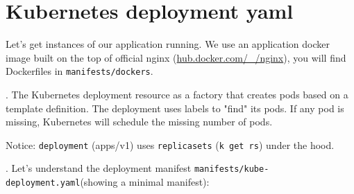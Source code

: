 \documentclass[12pt, letterpaper]{article}
\begin{document}

%
%
\section{Kubernetes deployment yaml}

Let's get instances of our application running. We use an application docker image built on the top of official nginx (\href{https://hub.docker.com/\_/nginx}{hub.docker.com/\_/nginx}), you will find Dockerfiles in \texttt{manifests/dockers}.

. The Kubernetes deployment resource as a factory that creates pods based on a template definition. The deployment uses labels to "find" its pods. If any pod is missing, Kubernetes will schedule the missing number of pods.

\begin{figure}[ht]
\centering
{}
\end{figure}

Notice: \verb|deployment| (apps/v1) uses \verb|replicasets| (\verb|k get rs|) under the hood.

. Let's understand the deployment manifest \texttt{manifests/kube-deployment.yaml}(showing a minimal manifest):

\inputminted{yaml}{manifests/kube-deployment.yaml}
\end{document}
